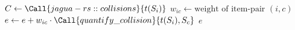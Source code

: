 \begin{algorithm}[ht]
    \caption{\texttt{evaluate\_sample}$(i,t)$}
    \begin{algorithmic}[1]
        \State $C \gets \Call{jagua-rs::collisions}{t(S_i)}$ 
         
            \State $w_{ic} \gets \text{weight of item-pair } (i,c)$
            \State $e \gets e + w_{ic} \cdot \Call{quantify\_collision}{t(S_i),S_c}$ 
        \EndFor
        \State \Return $e$
    \end{algorithmic}
    \label{alg:eval_sample}
\end{algorithm}

